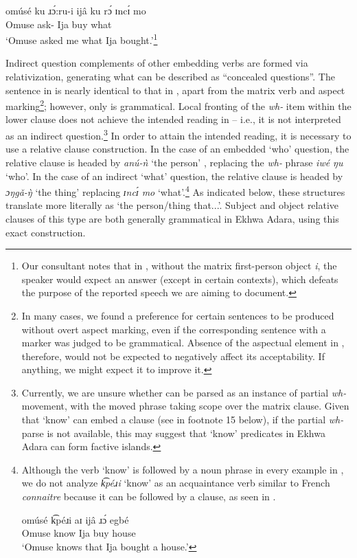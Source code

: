 \documentclass[output=paper,colorlinks,citecolor=brown
]{langscibook}
\begin{document}
\ea \label{ex:matte:new22}

\gll omúsé ku ɹɔ́:ru-i	ijâ	ku	rɔ́ ɪncɪ́ mo\\
Omuse \Pfv{} ask-\Fsg{} Ija \Pfv{} buy what \Foc{}\\
\glt `Omuse asked me what Ija bought.'\footnote{Our consultant notes that in , without the matrix first-person object \textit{i}, the speaker would expect an answer (except in certain contexts), which defeats the purpose of the reported speech we are aiming to document.}

\z

Indirect question complements of other embedding verbs are formed via relativization, generating what can be described as “concealed questions”. The sentence in  is nearly identical to that in , apart from the matrix verb and aspect marking\footnote{In many cases, we found a preference for certain sentences to be produced without overt aspect marking, even if the corresponding sentence with a marker was judged to be grammatical. Absence of the aspectual element in , therefore, would not be expected to negatively affect its acceptability. If anything, we might expect it to improve it.}; however, only  is grammatical. Local fronting of the \textit{wh-} item within the lower clause does not achieve the intended reading in  – i.e., it is not interpreted as an indirect question.\footnote{Currently, we are unsure whether  can be parsed as an instance of partial \textit{wh-} movement, with the moved phrase taking scope over the matrix clause. Given that `know' can embed a clause (see  in footnote 15 below), if the partial \textit{wh-} parse is not available, this may suggest that `know' predicates in Ekhwa Adara can form factive islands.} In order to attain the intended reading, it is necessary to use a relative clause construction. In the case of an embedded `who' question, the relative clause is headed by \textit{anú-ǹ} `the person' , replacing the \textit{wh-} phrase \textit{iwé ŋu} `who'. In the case of an indirect `what' question, the relative clause is headed by \textit{ɔŋgǎ-ŋ̀} ‘the thing’  replacing \textit{ɪncɪ́ mo} `what'.\footnote{Although
    the verb `know' is followed by a noun phrase in every example in , we do not analyze \textit{k͡péɹi} `know' as an acquaintance verb similar to French \textit{connaitre} because it can be followed by a clause, as seen in .

    \ea \label{ex:matte:ii}
        \gll omúsé	k͡péɹi	aɪ	ijâ	ɹɔ́	egbé\\ 
        Omuse know \Comp{} Ija buy house\\
        \glt `Omuse knows that Ija bought a house.'
    \z
}
As indicated below, these structures translate more literally as `the person/thing that...'. Subject and object relative clauses of this type are both generally grammatical in Ekhwa Adara, using this exact construction.
\end{document}
